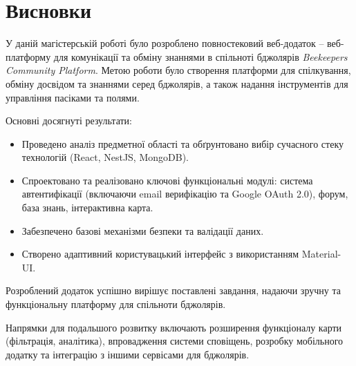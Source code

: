 \chapter*{Висновки}
\label{ch:conclusions}


У даній магістерській роботі було розроблено повностековий веб-додаток – веб-платформу для комунікації та обміну знаннями в спільноті бджолярів \textit{Beekeepers Community Platform}. 
Метою роботи було створення платформи для спілкування, обміну досвідом та знаннями серед бджолярів, а також надання інструментів для управління пасіками та полями.

Основні досягнуті результати:
\begin{itemize}
    \item Проведено аналіз предметної області та обґрунтовано вибір сучасного стеку технологій (React, NestJS, MongoDB).
    \item Спроектовано та реалізовано ключові функціональні модулі: система автентифікації (включаючи email верифікацію та Google OAuth 2.0), форум, база знань, інтерактивна карта.
    \item Забезпечено базові механізми безпеки та валідації даних.
    \item Створено адаптивний користувацький інтерфейс з використанням Material-UI.
\end{itemize}

Розроблений додаток успішно вирішує поставлені завдання, надаючи зручну та функціональну платформу для спільноти бджолярів. 

Напрямки для подальшого розвитку включають розширення функціоналу карти (фільтрація, аналітика), впровадження системи сповіщень, розробку мобільного додатку та інтеграцію з іншими сервісами для бджолярів. 